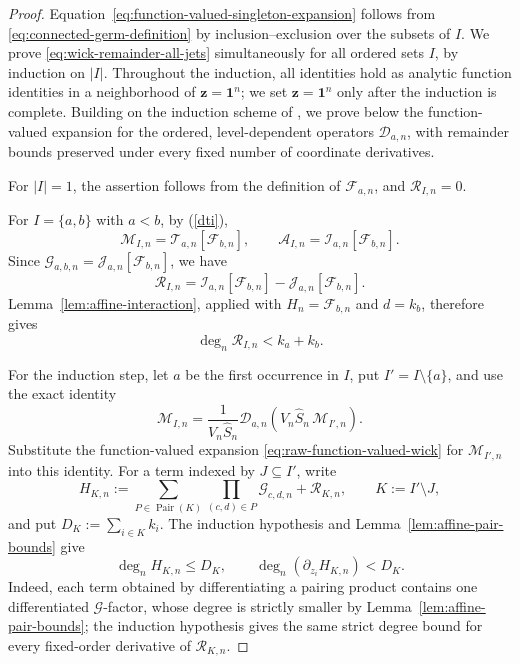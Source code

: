 \documentclass[11pt]{amsart}
\theoremstyle{plain}
\numberwithin{equation}{section}
\numberwithin{theorem}{section}
\numberwithin{figure}{section}
\begin{document}
\begin{proof}
Equation~\eqref{eq:function-valued-singleton-expansion} follows from
\eqref{eq:connected-germ-definition} by inclusion--exclusion over the
subsets of \(I\).
We prove \eqref{eq:wick-remainder-all-jets} simultaneously for all
ordered sets \(I\), by induction on \(|I|\). Throughout the induction,
all identities hold as analytic function identities in a neighborhood
of \(\mathbf z=\mathbf1^n\); we set \(\mathbf z=\mathbf1^n\) only
after the induction is complete. Building on the induction scheme of
\cite[Proposition~5.10]{bg16}, we prove below the function-valued
expansion for the ordered, level-dependent operators
\(\mathscr D_{a,n}\), with remainder bounds preserved under every
fixed number of coordinate derivatives.

For \(|I|=1\), the assertion follows from the definition of
\(\mathcal F_{a,n}\), and \(\mathcal R_{I,n}=0\).  

For \(I=\{a,b\}\) with \(a<b\), by (\ref{dti}),
\[
    \mathcal M_{I,n}
    =\mathscr T_{a,n}[\mathcal F_{b,n}],
    \qquad
    \mathcal A_{I,n}
    =\mathscr I_{a,n}[\mathcal F_{b,n}].
\]
Since
\(\mathcal G_{a,b,n}
=\mathscr J_{a,n}[\mathcal F_{b,n}]\), we have
\[
    \mathcal R_{I,n}
    =
    \mathscr I_{a,n}[\mathcal F_{b,n}]
    -
    \mathscr J_{a,n}[\mathcal F_{b,n}].
\]
Lemma~\ref{lem:affine-interaction}, applied with
\(H_n=\mathcal F_{b,n}\) and \(d=k_b\), therefore gives
\[
    \deg_n\mathcal R_{I,n}<k_a+k_b.
\]

For the induction step, let \(a\) be the first occurrence in \(I\),
put \(I'=I\setminus\{a\}\), and use the exact identity
\[
    \mathcal M_{I,n}
    =
    \frac{1}{V_n\widehat S_n}
    \mathscr D_{a,n}
    \left(V_n\widehat S_n\,\mathcal M_{I',n}\right).
\]
Substitute the function-valued expansion
\eqref{eq:raw-function-valued-wick} for \(\mathcal M_{I',n}\) into
this identity.  For a term indexed by \(J\subseteq I'\), write
\[
    H_{K,n}
    :=
    \sum_{P\in\operatorname{Pair}(K)}
    \prod_{(c,d)\in P}\mathcal G_{c,d,n}
    +\mathcal R_{K,n},
    \qquad
    K:=I'\setminus J,
\]
and put \(D_K:=\sum_{i\in K}k_i\).  The induction hypothesis and
Lemma~\ref{lem:affine-pair-bounds} give
\[
    \deg_n H_{K,n}\leq D_K,
    \qquad
    \deg_n(\partial_{z_i}H_{K,n})<D_K.
\]
Indeed, each term obtained by differentiating a pairing product
contains one differentiated \(\mathcal G\)-factor, whose degree is
strictly smaller by Lemma~\ref{lem:affine-pair-bounds}; the induction
hypothesis gives the same strict degree bound for every fixed-order
derivative of \(\mathcal R_{K,n}\).


\end{proof}
\end{document}

